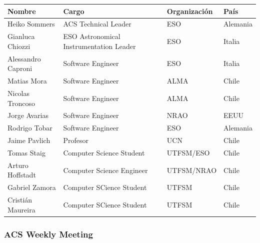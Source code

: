 \begin{tabular}{|l|l|l|l|}
	\hline
	{\bf Nombre} & {\bf Cargo} & {\bf Organización} & {\bf País} \\\hline
	Heiko Sommers & ACS Technical Leader & ESO & Alemania \\\hline
	Gianluca Chiozzi & ESO Astronomical Instrumentation Leader & ESO & Italia \\\hline
	Alessandro Caproni & Software Engineer& ESO & Italia \\\hline
	Matias Mora & Software Engineer & ALMA & Chile \\\hline
	Nicolas Troncoso & Software Engineer & ALMA & Chile \\\hline
	Jorge Avarias & Software Engineer & NRAO & EEUU \\\hline
	Rodrigo Tobar & Software Engineer & ESO & Alemania \\\hline
	Jaime Pavlich & Profesor & UCN & Chile \\\hline
	Tomas Staig & Computer Science Student & UTFSM/ESO & Chile \\\hline
	Arturo Hoffstadt & Computer Science Engineer & UTFSM/NRAO & Chile \\\hline
	Gabriel Zamora & Computer SCience Student & UTFSM & Chile \\\hline
	Cristián Maureira & Computer SCience Student & UTFSM & Chile \\\hline	
\end{tabular}

\subsubsection{ACS Weekly Meeting}

